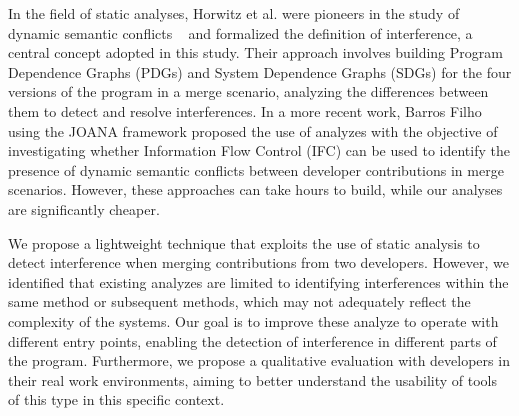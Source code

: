 \documentclass[sigconf,review]{acmart}
\begin{document}

In the field of static analyses, Horwitz et al. were pioneers in the study of dynamic semantic conflicts ~\cite{Horwitz1989IntegratingNV,horwitz1990interprocedural,yang1992program} and formalized the definition of interference, a central concept adopted in this study. Their approach involves building Program Dependence Graphs (PDGs)\cite{Horwitz1989IntegratingNV} and System Dependence Graphs (SDGs)\cite{horwitz1990interprocedural} for the four versions of the program in a merge scenario, analyzing the differences between them to detect and resolve interferences. In a more recent work, Barros Filho \cite{barros2017using} using the JOANA framework\cite{joana-paper} proposed the use of analyzes with the objective of investigating whether Information Flow Control (IFC) can be used to identify the presence of dynamic semantic conflicts between developer contributions in merge scenarios. However, these approaches can take hours to build, while our analyses are significantly cheaper.


We propose a lightweight technique that exploits the use of static analysis to detect interference when merging contributions from two \cite{galileu} developers. However, we identified that existing analyzes are limited to identifying interferences within the same method or subsequent methods, which may not adequately reflect the complexity of the systems. Our goal is to improve these analyze to operate with different entry points, enabling the detection of interference in different parts of the program. Furthermore, we propose a qualitative evaluation with developers in their real work environments, aiming to better understand the usability of tools of this type in this specific context.

\end{document}
